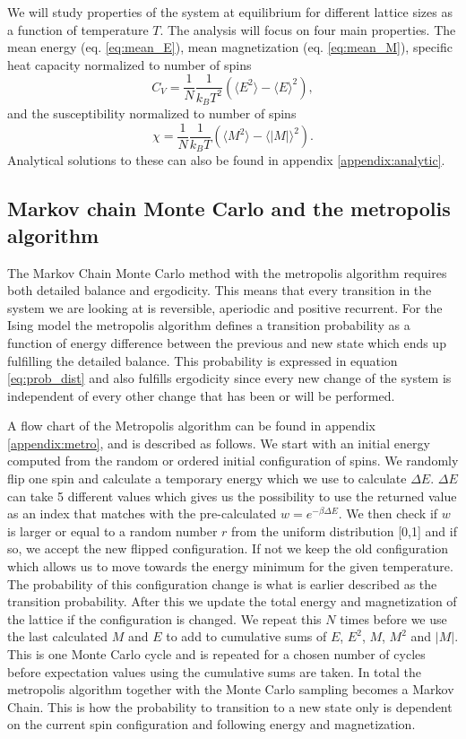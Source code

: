 \documentclass[english,notitlepage,reprint,nofootinbib]{revtex4-1}  %
\begin{document}
We will study properties of the system at equilibrium for different lattice sizes as a function of temperature $T$. The analysis will focus on four main properties. The mean energy (eq. \ref{eq:mean_E}), mean magnetization (eq. \ref{eq:mean_M}), specific heat capacity normalized to number of spins
\begin{equation}
    C_V = \frac{1}{N} \frac{1}{k_B T^2} \left( \langle E^2 \rangle - \langle E \rangle^2 \right),
\end{equation}
and the susceptibility normalized to number of spins
\begin{equation}
    \chi = \frac{1}{N} \frac{1}{k_B T} \left( \langle M^2 \rangle - \langle |M| \rangle^2 \right).
\end{equation}
Analytical solutions to these can also be found in appendix \ref{appendix:analytic}.


\subsection*{Markov chain Monte Carlo and the metropolis algorithm}
The Markov Chain Monte Carlo method with the metropolis algorithm requires both detailed balance and ergodicity. This means that every transition in the system we are looking at is reversible, aperiodic and positive recurrent. For the Ising model the metropolis algorithm defines a transition probability as a function of energy difference between the previous and new state which ends up fulfilling the detailed balance. This probability is expressed in equation \ref{eq:prob_dist} and also fulfills ergodicity since every new change of the system is independent of every other change that has been or will be performed.

A flow chart of the Metropolis algorithm can be found in appendix \ref{appendix:metro}, and is described as follows. We start with an initial energy computed from the random or ordered initial configuration of spins. We randomly flip one spin and calculate a temporary energy which we use to calculate $\Delta E$. $\Delta E$ can take 5 different values which gives us the possibility to use the returned value as an index that matches with the pre-calculated $w= e^{-\beta \Delta E}$. We then check if $w$ is larger or equal to a random number $r$ from the uniform distribution [0,1] and if so, we accept the new flipped configuration. If not we keep the old configuration which allows us to move towards the energy minimum for the given temperature. The probability of this configuration change is what is earlier described as the transition probability. After this we update the total energy and magnetization of the lattice if the configuration is changed. We repeat this $N$ times before we use the last calculated $M$ and $E$ to add to cumulative sums of $E$, $E^2$, $M$, $M^2$ and $|M|$. This is one Monte Carlo cycle and is repeated for a chosen number of cycles before expectation values using the cumulative sums are taken. In total the metropolis algorithm together with the Monte Carlo sampling becomes a Markov Chain. This is how the probability to transition to a new state only is dependent on the current spin configuration and following energy and magnetization.
\end{document}

